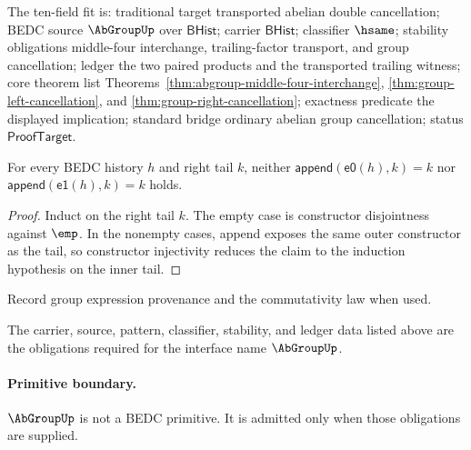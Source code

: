 The ten-field fit is: traditional target transported abelian double
cancellation; BEDC source $\AbGroupUp$ over $\mathsf{BHist}$; carrier
$\mathsf{BHist}$; classifier $\hsame$; stability obligations middle-four
interchange, trailing-factor transport, and group cancellation; ledger the two
paired products and the transported trailing witness; core theorem list
Theorems~\ref{thm:abgroup-middle-four-interchange},
\ref{thm:group-left-cancellation}, and \ref{thm:group-right-cancellation};
exactness predicate the displayed implication; standard bridge ordinary
abelian group cancellation; status $\mathsf{ProofTarget}$.

\begin{theorem}
\label{thm:abgroup-history-append-nonempty-left-ne-right}
For every BEDC history $h$ and right tail $k$, neither
$\mathsf{append}(\mathsf{e0}(h),k)=k$ nor
$\mathsf{append}(\mathsf{e1}(h),k)=k$ holds.
\end{theorem}
\begin{proof}
Induct on the right tail $k$. The empty case is constructor disjointness
against $\emp$. In the nonempty cases, append exposes the same outer
constructor as the tail, so constructor injectivity reduces the claim to the
induction hypothesis on the inner tail.
\end{proof}

\begin{definition}
\label{def:abgroup-ledger-policy}
Record group expression provenance and the commutativity law when used.
\end{definition}

\begin{definition}
\label{def:abgroup-certificate-obligations}
The carrier, source, pattern, classifier, stability, and ledger data listed above are the obligations required for the interface name \(\AbGroupUp\).
\end{definition}

\paragraph{Primitive boundary.}
\(\AbGroupUp\) is not a BEDC primitive. It is admitted only when those obligations are supplied.




